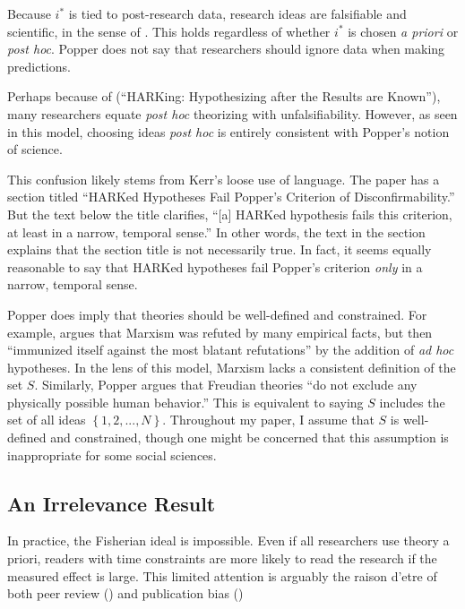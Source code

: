 \documentclass[12pt,english]{article}
\theoremstyle{plain}
\theoremstyle{plain}
\begin{document}
Because $i^\ast$ is tied to post-research data, research ideas are falsifiable and scientific, in the sense of \citet{Popper1959}. This holds regardless of whether $i^\ast$ is chosen \emph{a priori} or \emph{post hoc}. Popper does not say that researchers should ignore data when making predictions.


Perhaps because of \citet{kerr1998harking} (``HARKing: Hypothesizing after the Results are Known''), many researchers equate \emph{post hoc} theorizing with unfalsifiability. However, as seen in this model, choosing ideas \emph{post hoc} is entirely consistent with Popper's notion of science. 

This confusion likely stems from Kerr's loose use of language. The paper has a section titled  ``HARKed Hypotheses Fail Popper's Criterion of Disconfirmability.'' But the text below the title clarifies, ``[a] HARKed hypothesis fails this criterion, at least in a narrow, temporal sense.'' In other words, the text in the section explains that the section title is not necessarily true. In fact, it seems equally reasonable to say that HARKed hypotheses fail Popper's criterion \emph{only} in a narrow, temporal sense. 



Popper does imply that theories should be well-defined and constrained.  For example, \citet{Popper1985} argues that Marxism was refuted by many empirical facts, but then ``immunized itself against the most blatant refutations'' by the addition of \emph{ad hoc} hypotheses. In the lens of this model, Marxism lacks a consistent definition of the set $S$. Similarly, Popper argues that Freudian theories ``do not exclude any physically possible human behavior.'' This is equivalent to saying $S$ includes the set of all ideas $\left\{1,2,...,N\right\}$. Throughout my paper, I assume that $S$ is well-defined and constrained, though one might be concerned that this assumption is inappropriate for some social sciences.


\subsection{An Irrelevance Result}\label{sec:ez:irr}

In practice, the Fisherian ideal is impossible. Even if all researchers use theory a priori, readers with time constraints are more likely to read the research if the measured effect is large.  This limited attention is arguably the raison d'etre of both peer review (\citet{klamer2002attention}) and publication bias (\citet{chen2022publication})
\end{document}
